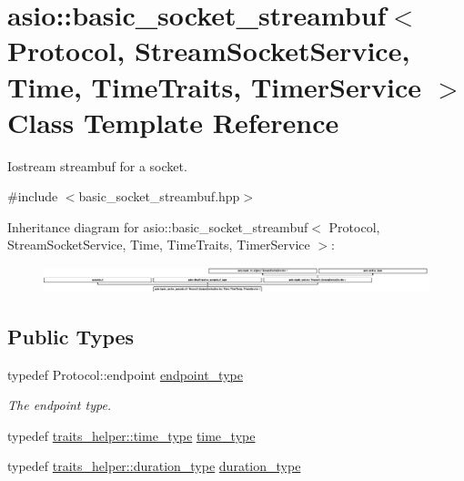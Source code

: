 \hypertarget{classasio_1_1basic__socket__streambuf}{}\section{asio\+:\+:basic\+\_\+socket\+\_\+streambuf$<$ Protocol, Stream\+Socket\+Service, Time, Time\+Traits, Timer\+Service $>$ Class Template Reference}
\label{classasio_1_1basic__socket__streambuf}


Iostream streambuf for a socket.  




{\ttfamily \#include $<$basic\+\_\+socket\+\_\+streambuf.\+hpp$>$}

Inheritance diagram for asio\+:\+:basic\+\_\+socket\+\_\+streambuf$<$ Protocol, Stream\+Socket\+Service, Time, Time\+Traits, Timer\+Service $>$\+:\begin{figure}[H]
\begin{center}
\leavevmode
\includegraphics[height=0.736842cm]{classasio_1_1basic__socket__streambuf}
\end{center}
\end{figure}
\subsection*{Public Types}
\begin{DoxyCompactItemize}
\item 
typedef Protocol\+::endpoint \hyperlink{classasio_1_1basic__socket__streambuf_a89b46b0c3c210f854b355799821fd5db}{endpoint\+\_\+type}
\begin{DoxyCompactList}\small\item\em The endpoint type. \end{DoxyCompactList}\item 
typedef \hyperlink{structasio_1_1detail_1_1chrono__time__traits_a19c14f4d45a8b164d2ea4590eebc1c10}{traits\+\_\+helper\+::time\+\_\+type} \hyperlink{classasio_1_1basic__socket__streambuf_ac26395546c2d9decf0bcbc40b8f78adc}{time\+\_\+type}
\item 
typedef \hyperlink{structasio_1_1detail_1_1chrono__time__traits_a7f122a7cb603e7516bb6595016960775}{traits\+\_\+helper\+::duration\+\_\+type} \hyperlink{classasio_1_1basic__socket__streambuf_a9205273677adfb1e713637662efa6e12}{duration\+\_\+type}
\end{DoxyCompactItemize}
